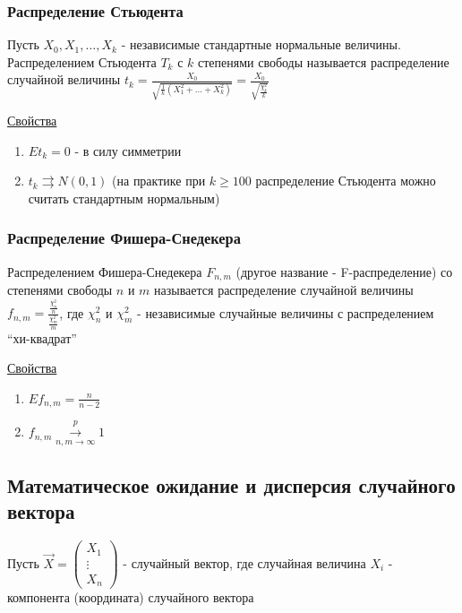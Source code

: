 \documentclass[12pt]{article}
\begin{document}
\subsubsection{Распределение Стьюдента}

\Def Пусть $X_0, X_1, \dots, X_k$ - независимые стандартные нормальные величины. 
Распределением Стьюдента $T_k$ с $k$ степенями свободы называется распределение случайной величины 
$t_k = \frac{X_0}{\sqrt{\frac{1}{k} (X_1^2 + \dots + X_k^2)}} = \frac{X_0}{\sqrt{\frac{\chi_k^2}{k}}}$

\underline{Свойства}

\begin{enumerate}
    \item $Et_k = 0$ - в силу симметрии

    \item $t_k \rightrightarrows N(0, 1)$ (на практике при $k \geq 100$ распределение Стьюдента можно считать стандартным нормальным)
\end{enumerate}

\subsubsection{Распределение Фишера-Снедекера}

\Def Распределением Фишера-Снедекера $F_{n,m}$ (другое название - F-распределение) со степенями свободы $n$ и $m$ называется распределение случайной величины 
$f_{n,m} = \frac{\frac{\chi^2_n}{n}}{\frac{\chi^2_m}{m}}$, где $\chi_n^2$ и $\chi_m^2$ - независимые случайные величины с распределением \enquote{хи-квадрат}

\underline{Свойства}

\begin{enumerate}
    \item $E f_{n,m} = \frac{n}{n - 2}$

    \item $f_{n,m} \overset{p}{\underset{n, m \to \infty}{\longrightarrow}} 1$
\end{enumerate}


\subsection{Математическое ожидание и дисперсия случайного вектора}

Пусть $\vec X = \begin{pmatrix}X_1 \\ \vdots \\ X_n\end{pmatrix}$ - случайный вектор, 
где случайная величина $X_i$ - компонента (координата) случайного вектора
\end{document}
